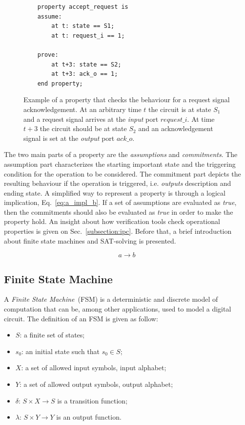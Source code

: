 \begin{figure}[htb!]
    \begin{lstlisting}
    property accept_request is
    assume:
        at t: state == S1;
        at t: request_i == 1;
    
    prove:
        at t+3: state == S2;
        at t+3: ack_o == 1;
    end property;\end{lstlisting}
    \caption{Example of a property that checks the behaviour for a request signal acknowledgement. At an arbitrary time $t$ the circuit is at state $S_1$ and a request signal arrives at the \textit{input} port $request\_i$. At time $t+3$ the circuit should be at state $S_2$ and an acknowledgement signal is set at the \textit{output} port $ack\_o$.}
    \label{fig:property}
\end{figure}

The two main parts of a property are the \textit{assumptions} and \textit{commitments}. The assumption part characterizes the starting important state and the triggering condition for the operation to be considered. The commitment part depicts the resulting behaviour if the operation is triggered, i.e. \textit{outputs} description and ending state. A simplified way to represent a property is through a logical implication, Eq.~\ref{eq:a_impl_b}. If a set of assumptions are evaluated as \textit{true}, then the commitments should also be evaluated as \textit{true} in order to make the property hold. An insight about how verification tools check operational properties is given on Sec.~\ref{subsection:ipc}. Before that, a brief introduction about finite state machines and SAT-solving is presented.

\begin{equation}
    a \longrightarrow b
    \label{eq:a_impl_b}
\end{equation}

\subsection*{Finite State Machine}

A \textit{Finite State Machine}~(FSM) is a deterministic and discrete model of computation that can be, among other applications, used to model a digital circuit. The definition of an FSM is given as follow:

\begin{itemize}
    \item[] $S$: a finite set of states;
    \item[] $s_{0}$: an initial state such that $s_0 \in S$;
    \item[] $X$: a set of allowed input symbols, input alphabet;
    \item[] $Y$: a set of allowed output symbols, output alphabet;
    \item[] $\delta$: $S \times X \to S$ is a transition function;
    \item[] $\lambda$: $S \times Y \to Y$ is an output function.
\end{itemize}

